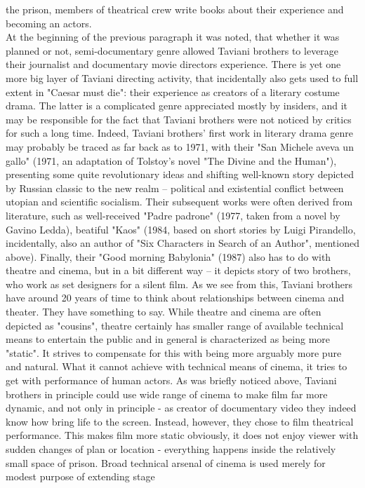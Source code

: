 \documentclass[10pt]{article}
\begin{document}
the prison, members of theatrical crew write books about their experience and becoming an actors.\\
At the beginning of the previous paragraph it was noted, that whether it was planned or not, semi-documentary genre allowed Taviani brothers to
leverage their journalist and documentary movie directors experience. 
There is yet one more big layer of Taviani directing activity, that incidentally
also gets used to full extent in "Caesar must die": their experience as creators of a literary costume drama. The latter is a complicated
genre appreciated mostly by insiders, and it may be responsible for the fact that Taviani brothers were not noticed by critics for such a long time.
Indeed, Taviani brothers' first work in literary drama genre may probably be traced as far back as to 1971, with their 
"San Michele aveva un gallo" (1971, an adaptation of Tolstoy's novel "The Divine and the Human"), presenting some quite revolutionary ideas
and shifting well-known story depicted by Russian classic to the new realm -- political and existential conflict between utopian and scientific 
socialism. Their subsequent works were often derived from literature, such as well-received "Padre padrone" (1977, taken from a novel by Gavino
Ledda), beatiful "Kaos" (1984, based on short stories by Luigi Pirandello, incidentally, also an author of "Six Characters in Search of an
Author", mentioned above). Finally, their "Good morning Babylonia" (1987)
also has to do with theatre and cinema, but in a bit different way -- it depicts
story of two brothers, who work as set designers for a silent film. As we see from this, Taviani brothers have around 20 years of time to think
about relationships between cinema and theater. They have something to say. While theatre and cinema are often depicted as "cousins", theatre
certainly has smaller range of available technical means to entertain the public and in general is characterized as being more "static". It strives
to compensate for this with being more arguably more pure and natural. What it cannot achieve with technical means of cinema, it tries to get
with performance of human actors. As was briefly noticed above, Taviani brothers in principle could use wide range of cinema to make film far more
dynamic, and not only in principle - as creator of documentary video they indeed know how bring life to the screen. Instead, however, they chose
to film theatrical performance. This makes film more static obviously, it does not enjoy viewer with sudden changes of plan or location - everything
happens inside the relatively small space of prison. Broad technical arsenal of cinema is used merely for modest purpose of extending stage
\end{document}

